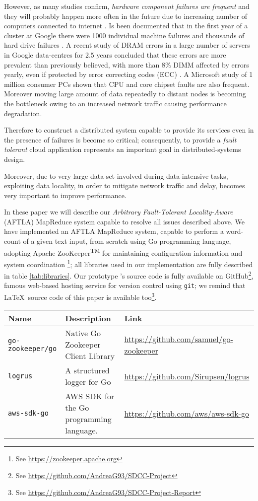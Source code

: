 \documentclass[sigchi]{acmart}
\begin{document}
However, as many studies confirm, \textit{hardware component failures are frequent} and they will probably happen more often in the future due to increasing number of computers connected to internet \citep{BFLMapReduce}. Is been documented that in the first year of a cluster at Google there were 1000 individual machine failures and thousands of hard drive failures \cite{PetaScaleFailure}. A recent study of DRAM errors in a large number of servers in Google data-centres for 2.5 years concluded that these errors are more prevalent than previously believed, with more than 8\% DIMM affected by errors yearly, even if protected by error correcting codes (ECC) \cite{DRAMError}. A Microsoft study of 1 million consumer PCs shown that CPU and core chipset faults are also frequent. \cite{MicrosoftStudyFailure} Moreover moving large amount of data repeatedly to distant nodes is becoming the bottleneck owing to an increased network traffic causing performance degradation.

Therefore to construct a distributed system capable to provide its services even in the presence of failures is become so critical; consequently, to provide a \textit{fault tolerant} cloud application represents an important goal in distributed-systems design. 

Moreover, due to very large data-set involved during data-intensive tasks, exploiting data locality, in order to mitigate network traffic and delay, becomes very important to improve performance.

In these paper we will describe our \textit{Arbitrary Fault-Tolerant Locality-Aware} (AFTLA) MapReduce system capable to resolve all issues described above. We have implemented an AFTLA MapReduce system, capable to perform a word-count of a given text input, from scratch using Go programming language, adopting Apache ZooKeeper\textsuperscript{TM} for maintaining configuration information and system coordination \footnote{See \url{https://zookeeper.apache.org}}; all libraries used in our implementation are fully described in table \ref{tab:libraries}. Our prototype    's source code is fully available on GitHub\footnote{See \url{https://github.com/AndreaG93/SDCC-Project}}, famous web-based hosting service for version control using \texttt{git}; we remind that \LaTeX\ source code of this paper is available too\footnote{See \url{https://github.com/AndreaG93/SDCC-Project-Report}}.  


\begin{table*}
  \caption{Libraries used in our implementation}
  \label{tab:libraries}
  \begin{tabular}{l|l|l}
    \toprule
    Name & Description & Link \\
    \midrule
    \texttt{go-zookeeper/go} & Native Go Zookeeper Client Library & \url{https://github.com/samuel/go-zookeeper} \\
    \texttt{logrus} & A structured logger for Go & \url{https://github.com/Sirupsen/logrus} \\
    \texttt{aws-sdk-go} & AWS SDK for the Go programming language. & \url{https://github.com/aws/aws-sdk-go} \\
    \bottomrule
  \end{tabular}
\end{table*}
\end{document}

